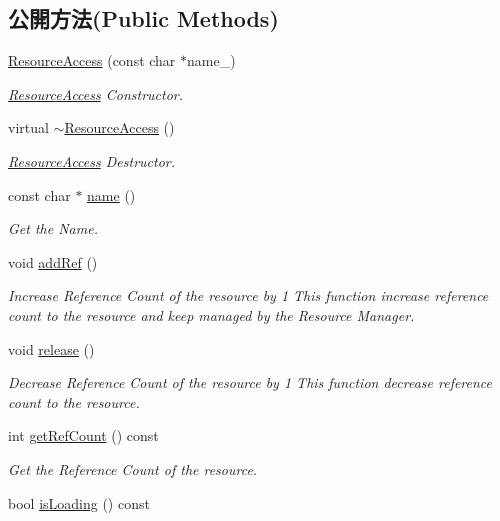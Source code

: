 \subsection*{公開方法(Public Methods)}
\begin{DoxyCompactItemize}
\item 
\hyperlink{class_i_dream_sky_1_1_resource_access_a4322947bdd4f7fb491daa02ac9a8c7d9}{Resource\+Access} (const char $\ast$name\+\_\+)
\begin{DoxyCompactList}\small\item\em \hyperlink{class_i_dream_sky_1_1_resource_access}{Resource\+Access} Constructor. \end{DoxyCompactList}\item 
virtual \hyperlink{class_i_dream_sky_1_1_resource_access_a7769800aa4f118eaccaa82a2cb9e02d1}{$\sim$\+Resource\+Access} ()
\begin{DoxyCompactList}\small\item\em \hyperlink{class_i_dream_sky_1_1_resource_access}{Resource\+Access} Destructor. \end{DoxyCompactList}\item 
const char $\ast$ \hyperlink{class_i_dream_sky_1_1_resource_access_aacebfe47ff62d9a3b23db0ad4c9c2767}{name} ()
\begin{DoxyCompactList}\small\item\em Get the Name. \end{DoxyCompactList}\item 
void \hyperlink{class_i_dream_sky_1_1_resource_access_a93e9d2b61b19334c64ec762cb04a3220}{add\+Ref} ()\hypertarget{class_i_dream_sky_1_1_resource_access_a93e9d2b61b19334c64ec762cb04a3220}{}\label{class_i_dream_sky_1_1_resource_access_a93e9d2b61b19334c64ec762cb04a3220}

\begin{DoxyCompactList}\small\item\em Increase Reference Count of the resource by 1 This function increase reference count to the resource and keep managed by the Resource Manager. \end{DoxyCompactList}\item 
void \hyperlink{class_i_dream_sky_1_1_resource_access_a5aeaaeb81a37dd6ceac1cc7251a480f5}{release} ()
\begin{DoxyCompactList}\small\item\em Decrease Reference Count of the resource by 1 This function decrease reference count to the resource. \end{DoxyCompactList}\item 
int \hyperlink{class_i_dream_sky_1_1_resource_access_a64e4a911f49d166c02b9cd1f6f8c4e90}{get\+Ref\+Count} () const 
\begin{DoxyCompactList}\small\item\em Get the Reference Count of the resource. \end{DoxyCompactList}\item 
bool \hyperlink{class_i_dream_sky_1_1_resource_access_aee67422c4295313158b2682cbc8a2d53}{is\+Loading} () const \hypertarget{class_i_dream_sky_1_1_resource_access_aee67422c4295313158b2682cbc8a2d53}{}\label{class_i_dream_sky_1_1_resource_access_aee67422c4295313158b2682cbc8a2d53}


\end{DoxyCompactItemize}
